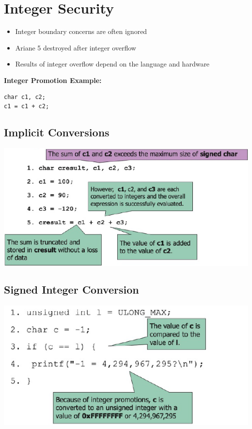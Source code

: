 \usepackage{listings}
\usepackage{graphicx}%

\section{Integer Security}
\begin{itemize}
    \item Integer boundary concerns are often ignored
    \item Ariane 5 destroyed after integer overflow
    \item Results of integer overflow depend on the language and hardware
\end{itemize}
\textbf{Integer Promotion Example:}
\begin{lstlisting}
char c1, c2;
c1 = c1 + c2;
\end{lstlisting}

\subsection{Implicit Conversions}
\includegraphics[width=\linewidth]{../img/implicit_conversions.png}

\subsection{Signed Integer Conversion}
\includegraphics[width=\linewidth]{../img/signed_integer_conversion.png}

